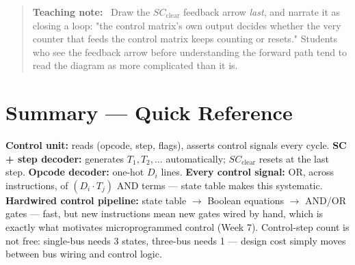 \documentclass[11pt]{article}
\newenvironment{teachingaside}{\begin{quote}\small\color{primary-gold}\textbf{Teaching note:}\ }{\end{quote}}
\begin{document}
\begin{teachingaside}
Draw the $SC_{\text{clear}}$ feedback arrow \emph{last}, and narrate it as closing a loop: "the control matrix's own output decides whether the very counter that feeds the control matrix keeps counting or resets." Students who see the feedback arrow before understanding the forward path tend to read the diagram as more complicated than it is.
\end{teachingaside}

\section{Summary --- Quick Reference}

\textbf{Control unit:} reads (opcode, step, flags), asserts control signals every cycle. \textbf{SC + step decoder:} generates $T_1, T_2, \dots$ automatically; $SC_{\text{clear}}$ resets at the last step. \textbf{Opcode decoder:} one-hot $D_i$ lines. \textbf{Every control signal:} OR, across instructions, of $(D_i \cdot T_j)$ AND terms --- state table makes this systematic. \textbf{Hardwired control pipeline:} state table $\to$ Boolean equations $\to$ AND/OR gates --- fast, but new instructions mean new gates wired by hand, which is exactly what motivates microprogrammed control (Week 7). Control-step count is not free: single-bus needs 3 states, three-bus needs 1 --- design cost simply moves between bus wiring and control logic.
\end{document}
